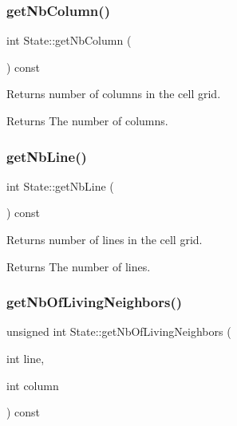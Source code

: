 \subsubsection{\texorpdfstring{get\+Nb\+Column()}{getNbColumn()}}
{\footnotesize\ttfamily int State\+::get\+Nb\+Column (\begin{DoxyParamCaption}{ }\end{DoxyParamCaption}) const\hspace{0.3cm}{\ttfamily [inline]}}

Returns number of columns in the cell grid.

\begin{DoxyReturn}{Returns}
The number of columns. 
\end{DoxyReturn}
\mbox{\label{class_state_a89f0f517cf988dd3ee1d952c853328d6}} 
\subsubsection{\texorpdfstring{get\+Nb\+Line()}{getNbLine()}}
{\footnotesize\ttfamily int State\+::get\+Nb\+Line (\begin{DoxyParamCaption}{ }\end{DoxyParamCaption}) const\hspace{0.3cm}{\ttfamily [inline]}}

Returns number of lines in the cell grid.

\begin{DoxyReturn}{Returns}
The number of lines. 
\end{DoxyReturn}
\mbox{\label{class_state_a8c0e0ddedf2b60efdf27f78884cea0ae}} 
\subsubsection{\texorpdfstring{get\+Nb\+Of\+Living\+Neighbors()}{getNbOfLivingNeighbors()}}
{\footnotesize\ttfamily unsigned int State\+::get\+Nb\+Of\+Living\+Neighbors (\begin{DoxyParamCaption}\item[{int}]{line,  }\item[{int}]{column }\end{DoxyParamCaption}) const}

